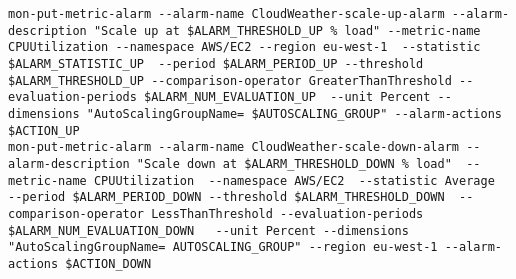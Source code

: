 \begin{lstlisting}
mon-put-metric-alarm --alarm-name CloudWeather-scale-up-alarm --alarm-description "Scale up at $ALARM_THRESHOLD_UP % load" --metric-name CPUUtilization --namespace AWS/EC2 --region eu-west-1  --statistic $ALARM_STATISTIC_UP  --period $ALARM_PERIOD_UP --threshold $ALARM_THRESHOLD_UP --comparison-operator GreaterThanThreshold --evaluation-periods $ALARM_NUM_EVALUATION_UP  --unit Percent --dimensions "AutoScalingGroupName= $AUTOSCALING_GROUP" --alarm-actions $ACTION_UP
mon-put-metric-alarm --alarm-name CloudWeather-scale-down-alarm --alarm-description "Scale down at $ALARM_THRESHOLD_DOWN % load"  --metric-name CPUUtilization  --namespace AWS/EC2  --statistic Average  --period $ALARM_PERIOD_DOWN --threshold $ALARM_THRESHOLD_DOWN  --comparison-operator LessThanThreshold --evaluation-periods $ALARM_NUM_EVALUATION_DOWN   --unit Percent --dimensions "AutoScalingGroupName= AUTOSCALING_GROUP" --region eu-west-1 --alarm-actions $ACTION_DOWN
\end{lstlisting}